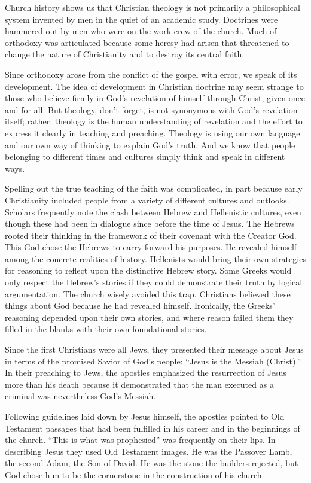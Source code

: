 Church history shows us that Christian theology is not primarily a philosophical system invented by
men in the quiet of an academic study. Doctrines were hammered out by men who were on the work crew
of the church. Much of orthodoxy was articulated because some heresy had arisen that threatened to
change the nature of Christianity and to destroy its central faith.

Since orthodoxy arose from the conflict of the gospel with error, we speak of its development. The
idea of development in Christian doctrine may seem strange to those who believe firmly in God’s
revelation of himself through Christ, given once and for all. But theology, don’t forget, is not
synonymous with God’s revelation itself; rather, theology is the human understanding of revelation
and the effort to express it clearly in teaching and preaching. Theology is using our own language
and our own way of thinking to explain God’s truth. And we know that people belonging to different
times and cultures simply think and speak in different ways.

Spelling out the true teaching of the faith was complicated, in part because early Christianity
included people from a variety of different cultures and outlooks. Scholars frequently note the
clash between Hebrew and Hellenistic cultures, even though these had been in dialogue since before
the time of Jesus. The Hebrews rooted their thinking in the framework of their covenant with the
Creator God. This God chose the Hebrews to carry forward his purposes. He revealed himself among the
concrete realities of history. Hellenists would bring their own strategies for reasoning to reflect
upon the distinctive Hebrew story. Some Greeks would only respect the Hebrew’s stories if they could
demonstrate their truth by logical argumentation. The church wisely avoided this trap. Christians
believed these things about God because he had revealed himself. Ironically, the Greeks’ reasoning
depended upon their own stories, and where reason failed them they filled in the blanks with their
own foundational stories.

Since the first Christians were all Jews, they presented their message about Jesus in terms of the
promised Savior of God’s people: “Jesus is the Messiah (Christ).” In their preaching to Jews, the
apostles emphasized the resurrection of Jesus more than his death because it demonstrated that the
man executed as a criminal was nevertheless God’s Messiah.

Following guidelines laid down by Jesus himself, the apostles pointed to Old Testament passages that
had been fulfilled in his career and in the beginnings of the church. “This is what was prophesied”
was frequently on their lips. In describing Jesus they used Old Testament images. He was the
Passover Lamb, the second Adam, the Son of David. He was the stone the builders rejected, but God
chose him to be the cornerstone in the construction of his church.

